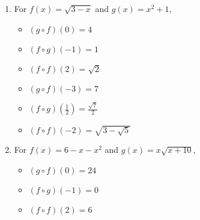 \begin{enumerate}
\item  For $f(x) = \sqrt{3-x}$ and $g(x) = x^2+1$,
\begin{multicols}{3}

\begin{itemize}

\item  $(g\circ f)(0) = 4$

\item  $(f\circ g)(-1) = 1$

\item  $(f \circ f)(2) = \sqrt{2}$

\end{itemize}

\end{multicols}

\begin{multicols}{3}

\begin{itemize}

\item  $(g\circ f)(-3) = 7$

\item  $(f\circ g)\left(\frac{1}{2}\right) = \frac{\sqrt{7}}{2}$

\item  $(f \circ f)(-2) = \sqrt{3 - \sqrt{5}}$

\end{itemize}

\end{multicols}

\pagebreak

\item  For  $f(x) = 6-x-x^2$ and $g(x) = x\sqrt{x+10}$,
\begin{multicols}{3}

\begin{itemize}

\item  $(g\circ f)(0) = 24$

\item  $(f\circ g)(-1) = 0$

\item  $(f \circ f)(2) = 6$

\end{itemize}

\end{multicols}

\begin{multicols}{3}

\begin{itemize}


\end{itemize}
\end{multicols}
\end{enumerate}

